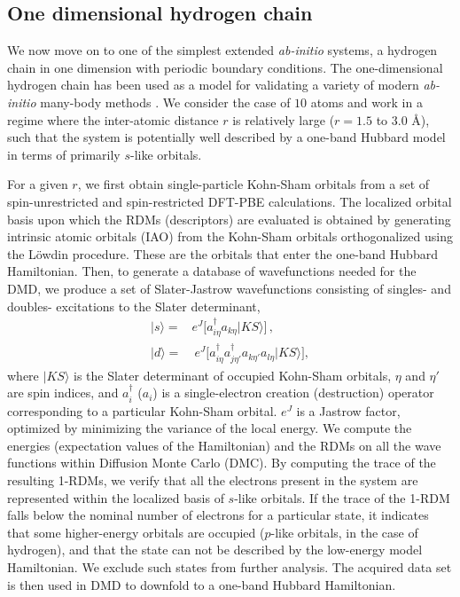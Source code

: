 \subsection{One dimensional hydrogen chain}
\label{subsection:1dhydrogen}
We now move on to one of the simplest extended \emph{ab-initio} systems, a hydrogen chain in one dimension with periodic boundary conditions. The one-dimensional hydrogen chain has been used as a model for validating a variety of modern \textit{ab-initio} many-body methods \cite{Motta_Simons}. 
We consider the case of $10$ atoms and work in a regime where the inter-atomic distance $r$ is 
relatively large ($r=1.5$ to $3.0$ \AA), such that the system is potentially well described by a one-band Hubbard model 
in terms of primarily $s$-like orbitals. 

For a given $r$, we first obtain single-particle Kohn-Sham orbitals from a set of spin-unrestricted and 
spin-restricted DFT-PBE calculations. The localized orbital basis upon which the RDMs (descriptors) 
are evaluated is obtained by generating intrinsic atomic orbitals (IAO) from the Kohn-Sham orbitals 
orthogonalized using the L\"owdin procedure. These are the orbitals that enter the one-band Hubbard Hamiltonian. 
Then, to generate a database of wavefunctions needed for the DMD, we produce a set of Slater-Jastrow 
wavefunctions consisting of singles- and doubles- excitations to the Slater determinant, 
\begin{subequations}
\begin{eqnarray}
| s \rangle = & e^J \Big[a^\dagger_{i \eta} a_{k \eta}   | KS \rangle \Big] \,,\\
| d \rangle = & \: e^J \Big[a^\dagger_{i \eta} a^\dagger_{j \eta'} a_{k \eta'} a_{l \eta}   | KS \rangle\Big] ,
\end{eqnarray}
\end{subequations}
where $|KS\rangle$ is the Slater determinant of occupied Kohn-Sham orbitals, $\eta$ and $\eta'$ are spin indices, 
and $a_{i}^\dagger$ ($a_{i}$) is a single-electron creation (destruction) operator corresponding to a particular Kohn-Sham orbital. $e^J$ is a Jastrow factor, optimized by minimizing the variance of the local energy. 
We compute the energies (expectation values of the Hamiltonian) and the RDMs on all the wave functions within Diffusion Monte Carlo (DMC). 
By computing the trace of the resulting 1-RDMs, we verify that all the electrons present in the system are represented within the localized basis of $s$-like orbitals. If the trace of the 1-RDM falls below the nominal number of electrons for a particular state, it 
indicates that some higher-energy orbitals are occupied ($p$-like orbitals, in the case of hydrogen), and that the state can not be described by the low-energy model Hamiltonian. We exclude such states from further analysis. The acquired data set is then used in DMD to 
downfold to a one-band Hubbard Hamiltonian.%

